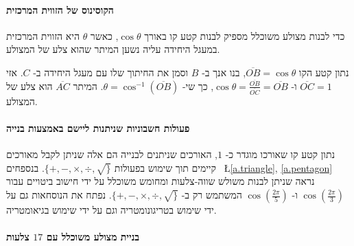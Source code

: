 \documentclass[11pt,a4paper]{article}
\newcommand*{\disfrac}[2]{\displaystyle\frac{#1}{#2}}
\begin{document}
\paragraph{הקוסינוס של הזווית המרכזית}
כדי לבנות מצולע משוכלל מספיק לבנות קטע קו באורך 
$\cos \theta$,
כאשר
$\theta$ 
היא הזווית המרכזית במעגל היחידה עליה נשען המיתר שהוא צלע של המצולע.
\begin{center}
\end{center}
נתון קטע הקו
$\overline{OB}=\cos\theta$,
בנו אנך ב-%
$B$
וסמן את החיתוך שלו עם מעגל היחידה ב-%
$C$.
אזי
$\overline{OC}=1$
ו-%
$\cos \theta=\disfrac{\overline{OB}}{\overline{OC}}=\overline{OB}$,
כך שי-%
$\theta = \cos^{-1} (\overline{OB})$.
המיתר 
$\overline{AC}$
הוא צלע של המצולע.

\paragraph{פעולות חשבוניות שניתנות ליישם באמצעות בנייה}

נתון קטע קו שאורכו מוגדר כ-%
$1$,
האורכים שניתנים לבנייה הם אלה שניתן לקבל מאורכים קיימים תוך שימוש בפעולות 
$\{+,-,\times,\div,\surd\}$.
בנספחים%
~\L{\ref{a.triangle}, \ref{a.pentagon}}
נראה שניתן לבנות משולש שווה-צלעות ומחומש משוכלל על ידי חישוב ביטויים עבור 
$\cos \left(\disfrac{2\pi}{3}\right)$
ו-%
$\cos\left(\disfrac{2\pi}{5}\right)$
המשתמש רק ב-%
$\{+,-,\times,\div,\surd\}$.
נפתח את הנוסחאות גם על ידי שימוש בטריגונומטריה וגם על ידי שימוש בגיאומטריה.

\paragraph{בניית מצולע משוכלל עם 
$17$
צלעות}
\end{document}
